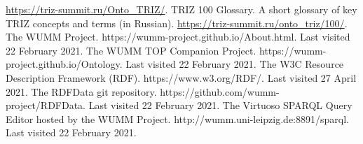 \documentclass[a4paper,11pt]{article}
\begin{document}
\begin{thebibliography}{...}
        \url{https://triz-summit.ru/Onto_TRIZ/}.
     TRIZ 100 Glossary. A short glossary of key TRIZ concepts and terms (in Russian).
        \url{https://triz-summit.ru/onto_triz/100/}.
     The WUMM Project. https://wumm-project.github.io/About.html. Last visited 22 February 2021.
     The WUMM TOP Companion Project. https://wumm-project.github.io/Ontology. Last visited 22 February 2021.
     The W3C Resource Description Framework (RDF). https://www.w3.org/RDF/. Last visited 27 April 2021.
     The RDFData git repository. https://github.com/wumm-project/RDFData.  Last visited 22 February 2021.
     The Virtuoso SPARQL Query Editor hosted by the WUMM Project. http://wumm.uni-leipzig.de:8891/sparql. Last visited 22 February 2021. 
\end{thebibliography}
\end{document}

